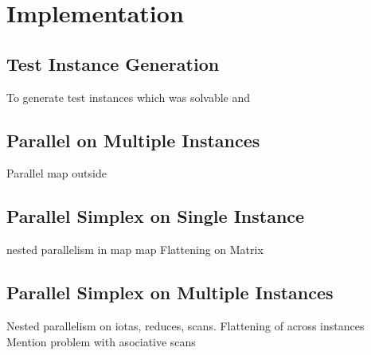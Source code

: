 \section{Implementation}
\subsection{Test Instance Generation}
To generate test instances which was solvable and 

\subsection{Parallel on Multiple Instances}
Parallel map outside

\subsection{Parallel Simplex on Single Instance}
nested parallelism in map map
Flattening on Matrix

\subsection{Parallel Simplex on Multiple Instances}
Nested parallelism on iotas, reduces, scans.
Flattening of across instances
Mention problem with asociative scans
